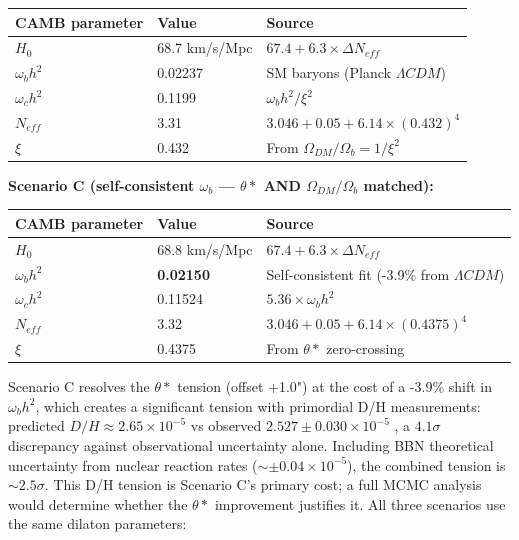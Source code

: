 \documentclass[aps,prd,preprint,superscriptaddress,longbibliography]{revtex4-2}
\begin{document}
\begin{table}[H]
\begin{ruledtabular}
\begin{tabular}{p{5.0cm}p{5.0cm}p{5.0cm}}
CAMB parameter & Value & Source \\
\hline
$H_{0}$ & 68.7 km/s/Mpc & $67.4 + 6.3 \times \Delta N_{eff}$ \\
$\omega_b h^{2}$ & 0.02237 & SM baryons (Planck $\Lambda CDM$) \\
$\omega_c h^{2}$ & 0.1199 & $\omega_b h^{2} / \xi^{2}$ \\
$N_{eff}$ & 3.31 & $3.046 + 0.05 + 6.14\times(0.432)^{4}$ \\
$\xi$ & 0.432 & From $\Omega_{DM}/\Omega_b = 1/\xi^{2}$ \\
\end{tabular}
\end{ruledtabular}
\end{table}

\textbf{Scenario C (self-consistent $\omega_b$ --- $\theta*$ AND $\Omega_{DM}/\Omega_b$ matched):}


\begin{table}[H]
\begin{ruledtabular}
\begin{tabular}{p{5.0cm}p{5.0cm}p{5.0cm}}
CAMB parameter & Value & Source \\
\hline
$H_{0}$ & 68.8 km/s/Mpc & $67.4 + 6.3 \times \Delta N_{eff}$ \\
$\omega_b h^{2}$ & \textbf{0.02150} & Self-consistent fit (-3.9\% from $\Lambda CDM$) \\
$\omega_c h^{2}$ & 0.11524 & $5.36 \times \omega_b h^{2}$ \\
$N_{eff}$ & 3.32 & $3.046 + 0.05 + 6.14\times(0.4375)^{4}$ \\
$\xi$ & 0.4375 & From $\theta*$ zero-crossing \\
\end{tabular}
\end{ruledtabular}
\end{table}

Scenario C resolves the $\theta*$ tension (offset +1.0") at the cost of a -3.9\% shift in $\omega_b h^{2}$, which creates a significant tension with primordial D/H measurements: predicted $D/H \approx 2.65\times10^{-5}$ vs observed $2.527 \pm 0.030\times10^{-5}$ \cite{Cooke2018_DH}, a $4.1\sigma$ discrepancy against observational uncertainty alone. Including BBN theoretical uncertainty from nuclear reaction rates ($\sim \pm0.04\times10^{-5}$), the combined tension is $\sim 2.5\sigma$. This D/H tension is Scenario C's primary cost; a full MCMC analysis would determine whether the $\theta*$ improvement justifies it. All three scenarios use the same dilaton parameters:
\end{document}
